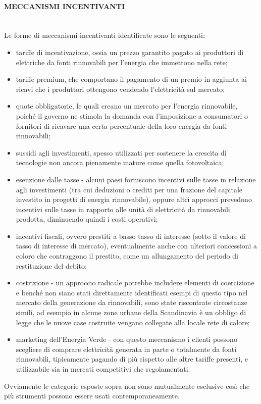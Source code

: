 \documentclass[12pt,a4paper,openright,twoside]{report}
\newcommand{\myparagraph}[1]{\paragraph{#1}\mbox{}\\}
\begin{document}
\myparagraph{MECCANISMI INCENTIVANTI}
Le forme di meccanismi incentivanti identificate sono le seguenti:
\begin{itemize}
\item tariffe di incentivazione, ossia un prezzo garantito pagato ai produttori di elettriche da fonti rinnovabili per l'energia che immettono nella rete;
\item tariffe premium, che comportano il pagamento di un premio in aggiunta ai ricavi che i produttori ottengono vendendo l'elettricità sul mercato;
\item quote obbligatorie, le quali creano un mercato per l'energia rinnovabile, poiché il governo ne stimola la domanda con l'imposizione a consumatori o fornitori di ricavare una certa percentuale della loro energia da fonti rinnovabili; 
\item sussidi agli investimenti, spesso utilizzati per sostenere la crescita di tecnologie non ancora pienamente mature come quella fotovoltaica;
\item esenzione dalle tasse - alcuni paesi forniscono incentivi sulle tasse in relazione agli investimenti (tra cui deduzioni o crediti per una frazione del capitale investito in progetti di energia rinnovabile), oppure altri approcci prevedono incentivi sulle tasse in rapporto alle unità di elettricità da rinnovabili prodotta, diminuendo quindi i costi operativi;
\item incentivi fiscali, ovvero prestiti a basso tasso di interesse (sotto il valore di tasso di interesse di mercato), eventualmente anche con ulteriori concessioni a coloro che contraggono il prestito, come un allungamento del periodo di restituzione del debito;
\item costrizione - un approccio radicale potrebbe includere elementi di coercizione e benché non siano stati direttamente identificati esempi di questo tipo nel mercato della generazione da rinnovabili, sono state riscontrate circostanze simili, ad esempio in alcune zone urbane della Scandinavia è un obbligo di legge che le nuove case costruite vengano collegate alla locale rete di calore;
\item marketing dell'Energia Verde - con questo meccanismo i clienti possono scegliere di comprare elettricità generata in parte o totalmente da fonti rinnovabili, tipicamente pagando di più rispetto alle altre tariffe presenti, e utilizzabile sia in mercati competitivi che regolamentati.
\end{itemize}
Ovviamente le categorie esposte sopra non sono mutualmente esclusive così che più strumenti possono essere usati contemporaneamente.
\end{document}
